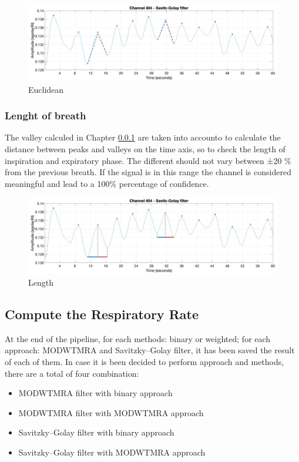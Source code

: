 \begin{figure}[H]
    \centering
    \includegraphics[width=\textwidth]{img/euclidian.png}
    \caption{Euclidean}
    \label{fig:Euclidean}
\end{figure}
\vspace*{0.3cm}

\subsubsection{Lenght of breath} \label{cap:BrethLength}
The valley calculed in Chapter \ref{cap:BrethLength} are taken into accounto to calculate the distance between peaks and valleys on the time axis, so to check the length of inspiration and expiratory phase. The different should not vary between ±20 \% from the previous breath. If the signal is in this range the channel is considered meaningful and lead to a 100\% percentage of confidence.\\
\vspace*{0.5cm}

\begin{figure}[H]
    \centering
    \includegraphics[width=\textwidth]{img/x_axis.png}
    \caption{Length}
    \label{fig:lenght}
\end{figure}
\vspace*{0.3cm}

\subsection{Compute the Respiratory Rate}

At the end of the pipeline, for each methods: binary or weighted; for each approach: MODWTMRA and Savitzky–Golay filter, it has been saved the result of each of them. In case it is been decided to perform approach and methods, there are a total of four combination:
\begin{itemize}
    \item MODWTMRA filter with binary approach
    \item MODWTMRA filter with MODWTMRA approach
    \item Savitzky–Golay filter with binary approach
    \item Savitzky–Golay filter with MODWTMRA approach   
\end{itemize}

